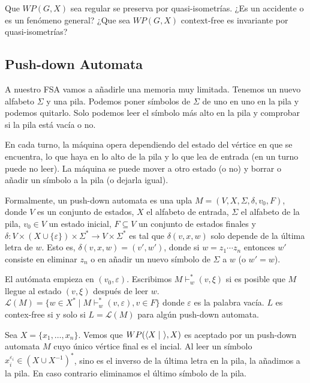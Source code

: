 \documentclass[twoside, 11pt]{article}
\begin{document}
\begin{observacion}
Que $WP(G,X)$ sea regular se preserva por quasi-isometrías. ¿Es un accidente o es un fenómeno general? ¿Que sea $WP(G,X)$ context-free es invariante por quasi-isometrías?
\end{observacion}

\subsection{Push-down Automata}

A nuestro FSA vamos a añadirle una memoria muy limitada. Tenemos un nuevo alfabeto $\Sigma$ y una pila. Podemos poner símbolos de $\Sigma$ de uno en uno en la pila y podemos quitarlo. Solo podemos leer el símbolo más alto en la pila y comprobar si la pila está vacía o no.

En cada turno, la máquina opera dependiendo del estado del vértice en que se encuentra, lo que haya en lo alto de la pila y lo que lea de entrada (en un turno puede no leer). La máquina se puede mover a otro estado (o no) y borrar o añadir un símbolo a la pila (o dejarla igual).

Formalmente, un push-down automata es una upla $M=(V,X,\Sigma, \delta, v_0, F)$, donde $V$ es un conjunto de estados, $X$ el alfabeto de entrada, $\Sigma$ el alfabeto de la pila, $v_0\in V$ un estado inicial, $F\subseteq V$ un conjunto de estados finales y $\delta:V\times (X\cup\{\varepsilon\})\times\Sigma^*\to V\times\Sigma^*$ es tal que $\delta(v,x,w)$ solo depende de la última letra de $w$. Esto es, $\delta(v,x,w)=(v',w')$, donde si $w=z_1\cdots z_n$ entonces $w'$ consiste en eliminar $z_n$ o en añadir un nuevo símbolo de $\Sigma$ a $w$ (o $w'=w$). 

El autómata empieza en $(v_0,\varepsilon)$. Escribimos $M\vdash_w^* (v,\xi)$ si es posible que $M$ llegue al estado $(v,\xi)$ después de leer $w$. $\mathcal{L}(M)=\{w\in X^*\mid M\vdash_w^* (v,\varepsilon), v\in F\}$ donde $\varepsilon$ es la palabra vacía. $L$ es contex-free si y solo si $L=\mathcal{L}(M)$ para algún push-down automata. 

\begin{ej}
Sea $X=\{x_1,\dots, x_n\}$. Vemos que $WP(\langle{X\mid\ }\rangle, X)$ es aceptado por un push-down automata $M$ cuyo único vértice final es el incial. Al leer un símbolo $x_i^{\varepsilon_i}\in (X\cup X^{-1})^*$, sino es el inverso de la última letra en la pila, la añadimos a la pila. En caso contrario eliminamos el último símbolo de la pila. 
\end{ej}
\end{document}
